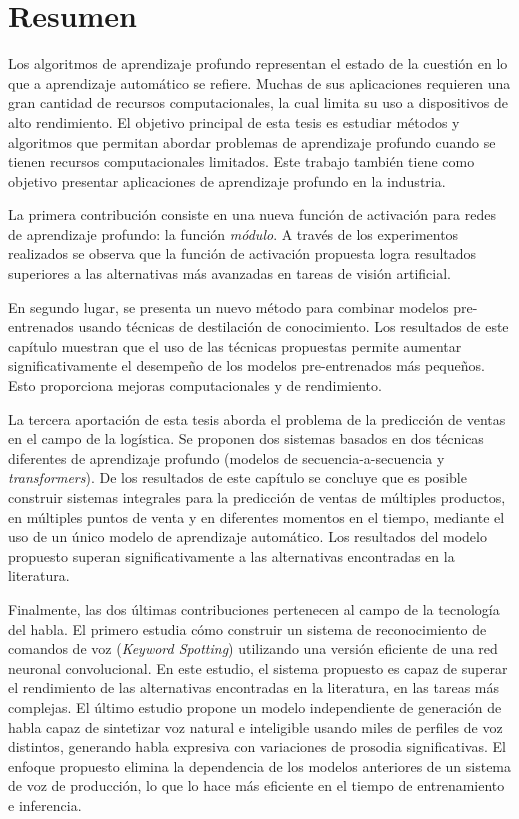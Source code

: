 
\chapter*{Resumen}


Los algoritmos de aprendizaje profundo representan el estado de la cuestión en lo que a aprendizaje automático se refiere. Muchas de sus aplicaciones requieren una gran cantidad de recursos computacionales, la cual limita su uso a dispositivos de alto rendimiento. El objetivo principal de esta tesis es estudiar métodos y algoritmos que permitan abordar problemas de aprendizaje profundo cuando se tienen recursos computacionales limitados. Este trabajo también tiene como objetivo presentar aplicaciones de aprendizaje profundo en la industria.

La primera contribución consiste en una nueva función de activación para redes de aprendizaje profundo: la función \textit{módulo}. A través de los experimentos realizados se observa que la función de activación propuesta logra resultados superiores a las alternativas más avanzadas en tareas de visión artificial.

En segundo lugar, se presenta un nuevo método para combinar modelos pre-entrenados usando técnicas de destilación de conocimiento. Los resultados de este capítulo muestran que el uso de las técnicas propuestas permite aumentar significativamente el desempeño de los modelos pre-entrenados más pequeños. Esto proporciona mejoras computacionales y de rendimiento.

La tercera aportación de esta tesis aborda el problema de la predicción de ventas en el campo de la logística. Se proponen dos sistemas basados en dos técnicas diferentes de aprendizaje profundo (modelos de secuencia-a-secuencia y \textit{transformers}). De los resultados de este capítulo se concluye que es posible construir sistemas integrales para la predicción de ventas de múltiples productos, en múltiples puntos de venta y en diferentes momentos en el tiempo, mediante el uso de un único modelo de aprendizaje automático. Los resultados del modelo propuesto superan significativamente a las alternativas encontradas en la literatura.

Finalmente, las dos últimas contribuciones pertenecen al campo de la tecnología del habla. El primero estudia cómo construir un sistema de reconocimiento de comandos de voz (\textit{Keyword Spotting}) utilizando una versión eficiente de una red neuronal convolucional. En este estudio, el sistema propuesto es capaz de superar el rendimiento de las alternativas encontradas en la literatura, en las tareas más complejas. El último estudio propone un modelo independiente de generación de habla capaz de sintetizar voz natural e inteligible usando miles de perfiles de voz distintos, generando habla expresiva con variaciones de prosodia significativas. El enfoque propuesto elimina la dependencia de los modelos anteriores de un sistema de voz de producción, lo que lo hace más eficiente en el tiempo de entrenamiento e inferencia.





\clearpage
